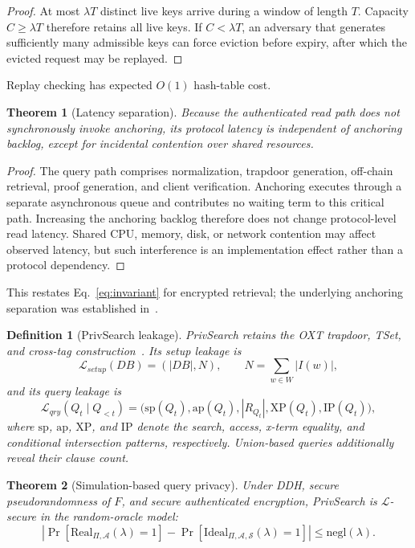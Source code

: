\documentclass[journal]{IEEEtran}
\theoremstyle{tight}
\newtheorem{definition}{Definition}
\newtheorem{theorem}{Theorem}
\theoremstyle{remark}
\theoremstyle{plain}
\begin{document}
\begin{proof}
At most \(\lambda T\) distinct live keys arrive during a window of length \(T\). Capacity \(C\geq\lambda T\) therefore retains all live keys. If \(C<\lambda T\), an adversary that generates sufficiently many admissible keys can force eviction before expiry, after which the evicted request may be replayed.
\end{proof}

Replay checking has expected \(O(1)\) hash-table cost.

\begin{theorem}[Latency separation]
\label{thm:latsep}
Because the authenticated read path does not synchronously invoke anchoring, its protocol latency is independent of anchoring backlog, except for incidental contention over shared resources.
\end{theorem}

\begin{proof}
The query path comprises normalization, trapdoor generation, off-chain retrieval, proof generation, and client verification. Anchoring executes through a separate asynchronous queue and contributes no waiting term to this critical path. Increasing the anchoring backlog therefore does not change protocol-level read latency. Shared CPU, memory, disk, or network contention may affect observed latency, but such interference is an implementation effect rather than a protocol dependency.
\end{proof}

This restates Eq.~\eqref{eq:invariant} for encrypted retrieval; the underlying anchoring separation was established in~\cite{Nnadiekwe2026PureSearchHCC}.

\begin{definition}[PrivSearch leakage]
\label{def:leakage}
PrivSearch retains the OXT trapdoor, TSet, and cross-tag construction~\cite{Cash2013}. Its setup leakage is
\[
\mathcal{L}_{setup}(DB)=(|DB|,N),
\qquad
N=\sum_{w\in W}|I(w)|,
\]
and its query leakage is
\[
\mathcal{L}_{qry}(Q_t\mid Q_{<t})=
\bigl(
\mathrm{sp}(Q_t),
\mathrm{ap}(Q_t),
|R_{Q_t}|,
\mathrm{XP}(Q_t),
\mathrm{IP}(Q_t)
\bigr),
\]
where \(\mathrm{sp}\), \(\mathrm{ap}\), \(\mathrm{XP}\), and \(\mathrm{IP}\) denote the search, access, x-term equality, and conditional intersection patterns, respectively. Union-based queries additionally reveal their clause count.
\end{definition}

\begin{theorem}[Simulation-based query privacy]
\label{thm:sim}
Under DDH, secure pseudorandomness of \(F\), and secure authenticated encryption, PrivSearch is \(\mathcal{L}\)-secure in the random-oracle model:
\[
\left|
\Pr[\mathrm{Real}_{\Pi,\mathcal A}(\lambda)=1]
-\Pr[\mathrm{Ideal}_{\Pi,\mathcal A,\mathcal S}(\lambda)=1]
\right|
\leq\mathrm{negl}(\lambda).
\]
\end{theorem}
\end{document}
